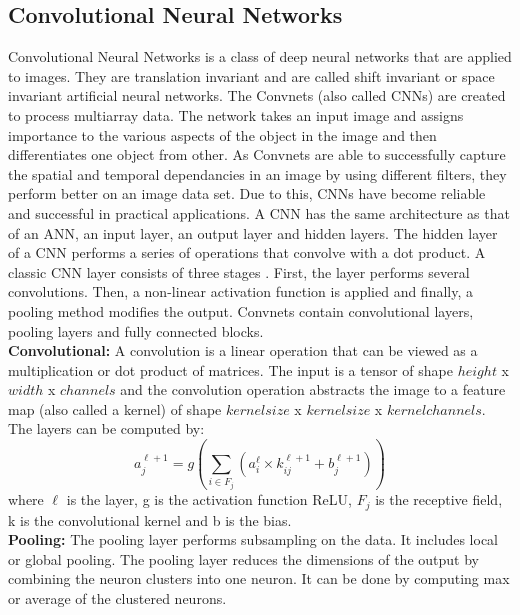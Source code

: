 \documentclass[fleqn,usenatbib]{mnras}
\begin{document}
\subsection{Convolutional Neural Networks}
\hspace{0.25 in}Convolutional Neural Networks \citep{LeCun1989} is a class of deep neural networks that are applied to images. They are translation invariant and are called shift invariant or space invariant artificial neural networks. The Convnets (also called CNNs) are created to process multiarray data. The network takes an input image and assigns importance to the various aspects of the object in the image and then differentiates one object from other. As Convnets are able to successfully capture the spatial and temporal dependancies in an image by using different filters, they perform better on an image data set. Due to this, CNNs have become reliable and successful in practical applications. A CNN has the same architecture as that of an ANN, an input layer, an output layer and hidden layers. The hidden layer of a CNN performs a series of operations that convolve with a dot product. A classic CNN layer consists of three stages \citep{Goodfellow-et-al-2016}. First, the layer performs several convolutions. Then, a non-linear activation function is applied and finally, a pooling method modifies the output. Convnets contain convolutional layers, pooling layers and fully connected blocks.\\
\hspace*{0.25 in}\textbf{Convolutional:} A convolution is a linear operation that can be viewed as a multiplication or dot product of matrices. The input is a tensor of shape $height$ x $width$ x $channels$ and the convolution operation abstracts the image to a feature map (also called a kernel) of shape $kernel size$ x $kernel size$ x $kernel channels$. The layers can be computed by:
\begin{equation}
    a^{\ell+1}_j = g(\sum_{i \in F_j}(a_i^\ell \times k_{ij}^{\ell+1} + b_j^{\ell+1}))
    \label{Convolution}
\end{equation}
where $\ell$ is the layer, g is the activation function ReLU, $F_j$ is the receptive field, k is the convolutional kernel and b is the bias. \\
\hspace*{0.25 in}\textbf{Pooling:} The pooling layer performs subsampling on the data. It includes local or global pooling. The pooling layer reduces the dimensions of the output by combining the neuron clusters into one neuron. It can be done by computing max or average of the clustered neurons.\\
\end{document}
